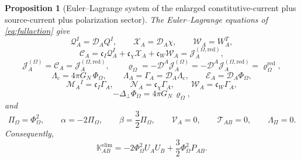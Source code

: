 \documentclass[11pt]{article}
\newcommand{\ProjSub}{P}
\newcommand{\SpatialD}{\mathcal D}
\newcommand{\LapPerp}{\Delta_\perp}
\newcommand{\FlowPot}{\Phi_\Omega}
\newcommand{\BalanceField}{\Pi_\Omega}
\newcommand{\BalMult}{\Lambda_\Pi}
\newcommand{\SourceDensity}{\varrho_\Omega}
\newcommand{\SourceDensityRed}{\varrho_\Omega^{\mathrm{red}}}
\newcommand{\SourceCurrent}{\mathcal J^{(\Omega)}}
\newcommand{\SourceCurrentRed}{\mathcal J^{(\Omega,\mathrm{red})}}
\newcommand{\ConstCurrent}{\mathcal C}
\newcommand{\QCarrier}{\mathcal Q}
\newcommand{\ChiCarrier}{\mathcal X}
\newcommand{\TransCarrier}{\mathcal W}
\newcommand{\ContMult}{\Lambda_{\mathrm c}}
\newcommand{\CurrentMult}{\Lambda}
\newcommand{\ConstGamma}{\Gamma}
\newcommand{\QMult}{\mathscr M}
\newcommand{\ChiMult}{\mathscr N}
\newcommand{\TransMult}{\mathscr W}
\newcommand{\SourceFlux}{\mathcal E}
\newcommand{\AuxPol}{\mathbb K}
\newtheorem{proposition}{Proposition}
\begin{document}
\begin{proposition}[Euler--Lagrange system of the enlarged constitutive-current plus source-current plus polarization sector]
\label{prop:EL}
The Euler--Lagrange equations of \eqref{eq:fullaction} give
\begin{equation}
\QCarrier^I_A=\SpatialD_AQ^I,
\qquad
\ChiCarrier_A=\SpatialD_A\chi,
\qquad
\TransCarrier_A=W_A^T,
\label{eq:carrierrels}
\end{equation}
\begin{equation}
\ConstCurrent_A
=
\mathfrak c_I\QCarrier^I_A
+\mathfrak c_\chi\ChiCarrier_A
+\mathfrak c_W\TransCarrier_A
=
\SourceCurrentRed_A,
\label{eq:constitutivecarrier}
\end{equation}
\begin{equation}
\SourceCurrent_A=\ConstCurrent_A=\SourceCurrentRed_A,
\qquad
\SourceDensity=-\SpatialD^A\SourceCurrent_A=-\SpatialD^A\SourceCurrentRed_A=\SourceDensityRed,
\label{eq:currenteqs}
\end{equation}
\begin{equation}
\ContMult=4\pi G_N\,\FlowPot,
\qquad
\CurrentMult_A=\ConstGamma_A=\SpatialD_A\ContMult,
\qquad
\SourceFlux_A=\SpatialD_A\FlowPot,
\label{eq:multflux}
\end{equation}
\begin{equation}
\QMult_{A}{}^{I}=\mathfrak c_I\ConstGamma_A,
\qquad
\ChiMult_A=\mathfrak c_\chi\ConstGamma_A,
\qquad
\TransMult_A=\mathfrak c_W\ConstGamma_A,
\label{eq:carrier_mults}
\end{equation}
\begin{equation}
-\LapPerp \FlowPot=4\pi G_N\,\SourceDensity,
\label{eq:poisson}
\end{equation}
and
\begin{equation}
\BalanceField=\FlowPot^2,
\qquad
\alpha=-2\BalanceField,
\qquad
\beta=\frac32\BalanceField,
\qquad
\mathcal V_A=0,
\qquad
\mathcal T_{AB}=0,
\qquad
\BalMult=0.
\label{eq:poleqs}
\end{equation}
Consequently,
\begin{equation}
\AuxPol_{AB}^{\mathrm{elim}}
=
-2\FlowPot^2U_AU_B
+\frac32\FlowPot^2\ProjSub_{AB}.
\label{eq:Kelim}
\end{equation}
\end{proposition}
\end{document}
